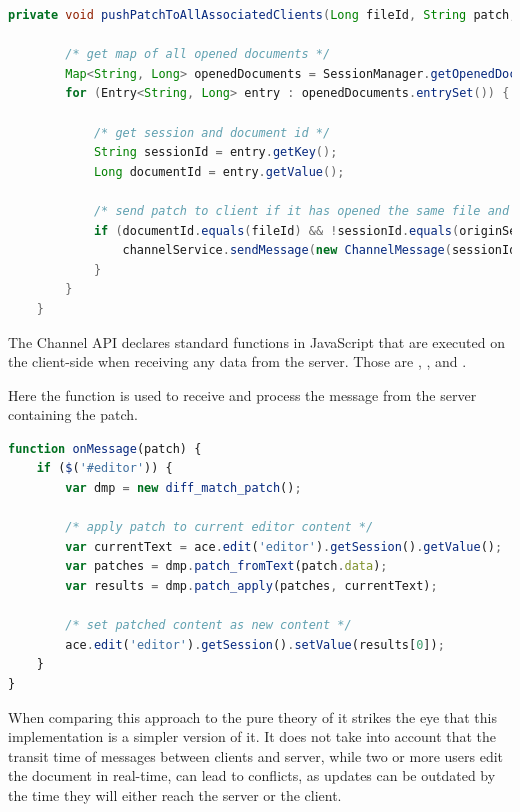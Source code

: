 \begin{lstlisting}[language=Java, caption=Broadcast Changes to All Associated Clients Having the Same Document Opened]
private void pushPatchToAllAssociatedClients(Long fileId, String patch, String originSessionId) {
        
        /* get map of all opened documents */
        Map<String, Long> openedDocuments = SessionManager.getOpenedDocuments();
        for (Entry<String, Long> entry : openedDocuments.entrySet()) {
            
            /* get session and document id */
            String sessionId = entry.getKey();
            Long documentId = entry.getValue();
            
            /* send patch to client if it has opened the same file and was NOT the one who made the changes */
            if (documentId.equals(fileId) && !sessionId.equals(originSessionId)){
                channelService.sendMessage(new ChannelMessage(sessionId, patch));
            }
        }
    }
\end{lstlisting}

The Channel API declares standard functions in JavaScript that are executed on the client-side when receiving any data from the server. Those are , ,  and . 

Here the  function is used to receive and process the message from the server containing the patch.

\pagebreak

\begin{lstlisting}[language=JavaScript, caption=Apply the Broadcasted Patch From the Server on the Client]
function onMessage(patch) {
    if ($('#editor')) {
        var dmp = new diff_match_patch();

        /* apply patch to current editor content */
        var currentText = ace.edit('editor').getSession().getValue();
        var patches = dmp.patch_fromText(patch.data);
        var results = dmp.patch_apply(patches, currentText);

        /* set patched content as new content */
        ace.edit('editor').getSession().setValue(results[0]);
    }
}
\end{lstlisting}

\label{simpler-ot-reason}

When comparing this approach to the pure theory of  it strikes the eye that this implementation is a simpler version of it. It does not take into account that the transit time of messages between clients and server, while two or more users edit the document in real-time, can lead to conflicts, as updates can be outdated by the time they will either reach the server or the client.

